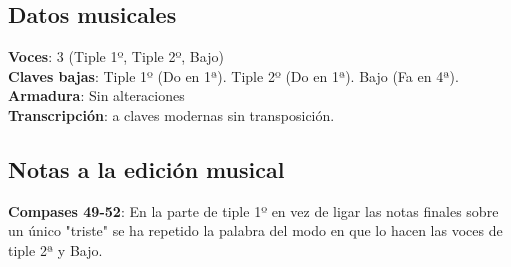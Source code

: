 \subsection*{Datos musicales}

\noindent \textbf{Voces}: 3 (Tiple 1º, Tiple 2º, Bajo)\\
\textbf{Claves bajas}: Tiple 1º (Do en 1ª). Tiple 2º (Do en 1ª). Bajo (Fa en 4ª).\\
\textbf{Armadura}: Sin alteraciones\\
\textbf{Transcripción}: a claves modernas sin transposición.

\subsection*{Notas a la edición musical}

\noindent \textbf{Compases 49-52}: En la parte de tiple 1º en vez de ligar las notas finales sobre un único "triste" se ha repetido la palabra del modo en que lo hacen las voces de tiple 2ª y Bajo.

